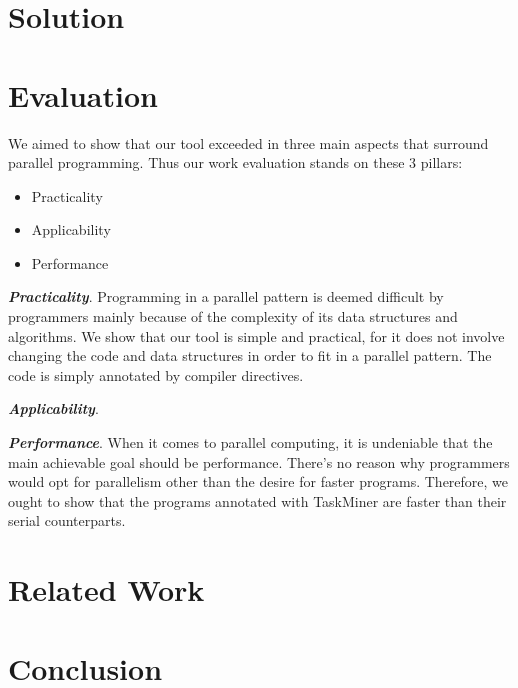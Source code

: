 \documentclass[pageno]{jpaper}
\begin{document}
\section{Solution}
\label{sec:sol}

\section{Evaluation}
\label{sec:eval}

We aimed to show that our tool exceeded in three main aspects that surround parallel programming. Thus our work evaluation stands on these 3 pillars:

\begin{itemize}

\item Practicality
\item Applicability
\item Performance

\end{itemize}

\textbf{\textit{Practicality}}. Programming in a parallel pattern is deemed difficult by programmers mainly because of the complexity of its data structures and algorithms. We show that our tool is simple and practical, for it does not involve changing the code and data structures in order to fit in a parallel pattern. The code is simply annotated by compiler directives.

\textbf{\textit{Applicability}}. 

\textbf{\textit{Performance}}. When it comes to parallel computing, it is undeniable that the main achievable goal should be performance. There's no reason why programmers would opt for parallelism other than the desire for faster programs. Therefore, we ought to show that the programs annotated with TaskMiner are faster than their serial counterparts. 

\section{Related Work}
\label{sec:rw}

\section{Conclusion}
\label{sec:conc}



\end{document}
